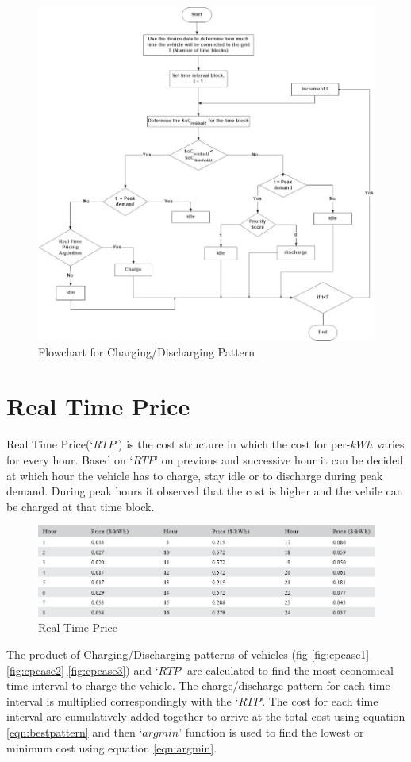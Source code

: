 	\begin{figure}
		\centering
		\includegraphics[width=0.9\linewidth]{Figures/Ev_flowchart}
		\caption{Flowchart for Charging/Discharging Pattern}
		\label{fig:evflowchart}
	\end{figure}


	\section{Real Time Price}
		Real Time Price(`$RTP$') is the cost structure in which the cost for per-$kWh$ varies for every hour. Based on `$RTP$' on previous and successive hour it can be decided at which hour the vehicle has to charge, stay idle or to discharge during peak demand. During peak hours it observed that the cost is higher and the vehile can be charged at that time block. 
		
	
		\begin{figure}[!h]
			\centering
			\includegraphics[width=0.7\linewidth]{Figures/rtp}
			\caption{Real Time Price}
			\label{fig:rtp}
		\end{figure}
	
		The product of Charging/Discharging patterns of vehicles (fig \ref{fig:cpcase1} \ref{fig:cpcase2} \ref{fig:cpcase3}) and `$RTP$' are calculated to find the most economical time interval to charge the vehicle. The charge/discharge pattern for each time interval is multiplied correspondingly with the `$RTP$'. The cost for each time interval are cumulatively added together to arrive at the total cost using equation \ref{eqn:bestpattern} and then `$argmin$' function is used to find the lowest or minimum cost using equation \ref{eqn:argmin}. 
	
